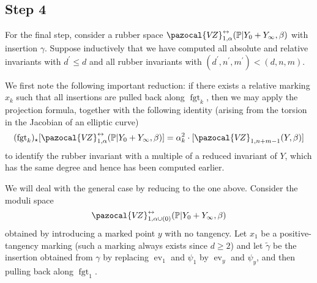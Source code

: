 \documentclass[11pt]{amsart}
\newcommand{\VZ}{\pazocal{V\!Z}}
\newcommand{\st}{\star}
\newcommand{\ev}{\operatorname{ev}}
\newcommand{\fgt}{\operatorname{fgt}}
\theoremstyle{definition}
\theoremstyle{definition}
\begin{document}
\subsection*{Step 4} For the final step, consider a rubber space $\VZ^{\leftrightarrow}_{1,\alpha}(\mathbb P|Y_0+Y_\infty,\beta)$ with insertion $\gamma$. Suppose inductively that we have computed all absolute and relative invariants with $d^\prime \leq d$ and all rubber invariants with $(d^\prime,n^\prime,m^\prime) < (d,n,m)$.

We first note the following important reduction: if there exists a relative marking $x_k$ such that all insertions are pulled back along $\fgt_{k}$, then we may apply the projection formula, together with the following identity (arising from the torsion in the Jacobian of an elliptic curve)
\begin{equation*} (\fgt_{k})_\st [\VZ^{\leftrightarrow}_{1,\alpha}(\mathbb P|Y_0+Y_\infty,\beta)] = \alpha_k^2 \cdot [\VZ_{1,n+m-1}(Y,\beta)] \end{equation*}
to identify the rubber invariant with a multiple of a reduced invariant of $Y$, which has the same degree and hence has been computed earlier.

We will deal with the general case by reducing to the one above. Consider the moduli space
\begin{equation*}\label{step 4 recursion space} \VZ^{\leftrightarrow}_{1,\alpha\cup (0)}(\mathbb P|Y_0+Y_\infty,\beta)\end{equation*}
obtained by introducing a marked point $y$ with no tangency. Let $x_1$ be a positive-tangency marking (such a marking always exists since $d \geq 2$) and let $\tilde\gamma$ be the insertion obtained from $\gamma$ by replacing $\ev_1$ and $\psi_1$ by $\ev_y$ and $\psi_y$, and then pulling back along $\fgt_1$.
\end{document}
